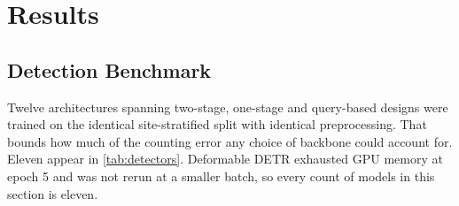 \section{Results}
\label{sec:results}

\subsection{Detection Benchmark}
\label{sec:detection}

Twelve architectures spanning two-stage, one-stage and query-based designs were trained on
the identical site-stratified split with identical preprocessing. That bounds how much of
the counting error any choice of backbone could account for. Eleven appear in
\cref{tab:detectors}. Deformable DETR exhausted GPU memory at epoch 5 and was not rerun at a
smaller batch, so every count of models in this section is eleven.

